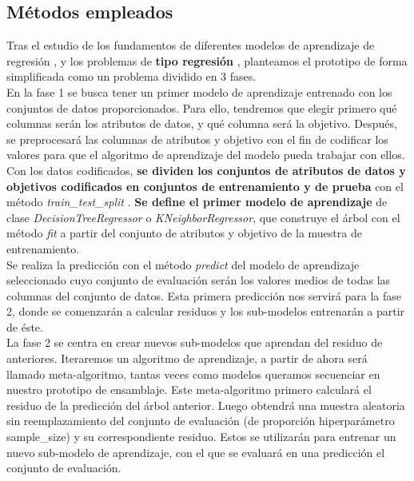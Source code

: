 \documentclass[conference,a4paper]{IEEEtran}
\begin{document}
\subsection{Métodos empleados}

Tras el estudio de los fundamentos de diferentes modelos de aprendizaje de regresión \cite{b5, b6, b15}, y los problemas de \textbf{tipo regresión} \cite{b1, b2}, planteamos el prototipo de forma simplificada como un problema dividido en 3 fases. \\

En la fase 1 se busca tener un primer modelo de aprendizaje entrenado con los conjuntos de datos proporcionados. Para ello, tendremos que elegir primero qué columnas serán los atributos de datos, y qué columna será la objetivo. Después, se preprocesará las columnas de atributos y objetivo con el fin de codificar\cite{b11, b12} los valores para que el algoritmo de aprendizaje del modelo pueda trabajar con ellos.\\

Con los datos codificados, \textbf{se dividen los conjuntos de atributos de datos y objetivos codificados en conjuntos de entrenamiento y de prueba} con el método \textit{train\_test\_split} \cite{b13}. \textbf{Se define el primer modelo de aprendizaje} de clase \textit{DecisionTreeRegressor} \cite{b2} o \textit{KNeighborRegressor}, que construye el árbol con el método \textit{fit} \cite{b16} a partir del conjunto de atributos y objetivo de la muestra de entrenamiento. \\

Se realiza la predicción con el método \textit{predict} \cite{b14} del modelo de aprendizaje seleccionado cuyo conjunto de evaluación serán los valores medios de todas las columnas del conjunto de datos. Esta primera predicción nos servirá para la fase 2, donde se comenzarán a calcular residuos y los sub-modelos entrenarán a partir de éste. \\

La fase 2 se centra en crear nuevos sub-modelos que aprendan del residuo de anteriores. Iteraremos un algoritmo de aprendizaje, a partir de ahora será llamado meta-algoritmo, tantas veces como modelos queramos secuenciar en nuestro prototipo de ensamblaje. Este meta-algoritmo primero calculará el residuo de la predicción del árbol anterior. Luego obtendrá una muestra aleatoria sin reemplazamiento del conjunto de evaluación (de proporción hiperparámetro sample\_size) y su correspondiente residuo. Estos se utilizarán para entrenar un nuevo sub-modelo de aprendizaje, con el que se evaluará en una predicción el conjunto de evaluación. \\
\end{document}
